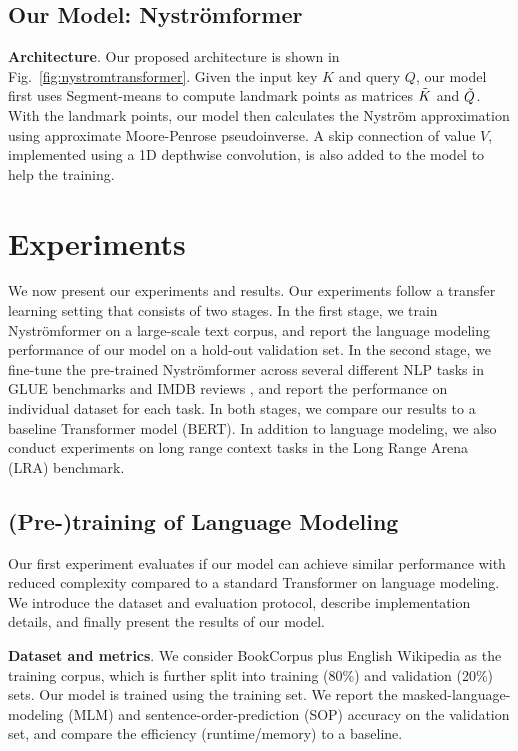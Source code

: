 \subsection{Our Model: Nystr\"{o}mformer}

\textbf{Architecture}. Our proposed architecture is shown in Fig.\ \ref{fig:nystromtransformer}. Given the input key $K$ and query $Q$, our model first uses Segment-means to compute landmark points as matrices $\Tilde{K}$ and $\Tilde{Q}$. With the landmark points, our model then calculates the Nystr\"{o}m approximation using approximate Moore-Penrose pseudoinverse. A skip connection of value $V$, implemented using a 1D depthwise convolution, is also added to the model to help the training.

\section{Experiments}

We now present our experiments and results. Our experiments follow a transfer learning setting that consists of two stages. In the first stage, we train Nystr\"{o}mformer on a large-scale text corpus, and report the language modeling performance of our model on a hold-out validation set. In the second stage, we fine-tune the pre-trained Nystr\"{o}mformer across several different NLP tasks in GLUE benchmarks \cite{wang2019glue} and IMDB reviews \cite{maas2011learning}, and report the performance on individual dataset for each task. In both stages, we compare our results to a baseline Transformer model (BERT). In addition to language modeling, we also conduct experiments on long range context tasks in the Long Range Arena (LRA) benchmark. 

\subsection{(Pre-)training of Language Modeling}

Our first experiment evaluates if our model can achieve similar performance with reduced complexity compared to a standard Transformer on language modeling. We introduce the dataset and evaluation protocol, describe implementation details, and finally present the results of our model.

\smallskip
 \textbf{Dataset and metrics}. We consider BookCorpus plus English Wikipedia as the training corpus, which is further split into training (80\%) and validation (20\%) sets. Our model is trained using the training set. We report the masked-language-modeling (MLM) and sentence-order-prediction (SOP) accuracy on the validation set, and compare the efficiency (runtime/memory) to a baseline. 

